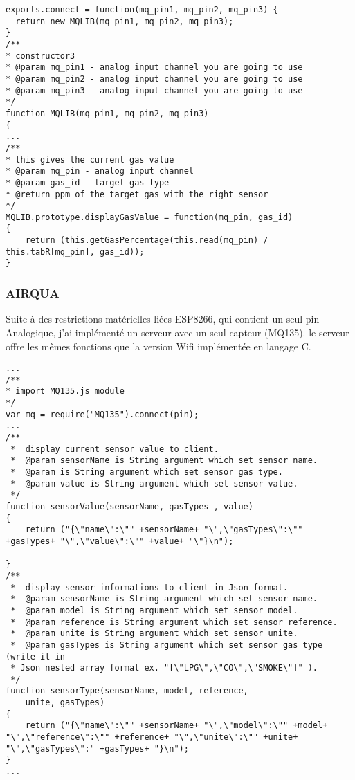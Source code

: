\begin{lstlisting}
exports.connect = function(mq_pin1, mq_pin2, mq_pin3) {
  return new MQLIB(mq_pin1, mq_pin2, mq_pin3);
}
/** 
* constructor3
* @param mq_pin1 - analog input channel you are going to use
* @param mq_pin2 - analog input channel you are going to use
* @param mq_pin3 - analog input channel you are going to use
*/
function MQLIB(mq_pin1, mq_pin2, mq_pin3)
{        
...
/**
* this gives the current gas value
* @param mq_pin - analog input channel
* @param gas_id - target gas type
* @return ppm of the target gas with the right sensor
*/
MQLIB.prototype.displayGasValue = function(mq_pin, gas_id)
{
    return (this.getGasPercentage(this.read(mq_pin) / this.tabR[mq_pin], gas_id));
}
\end{lstlisting}


\subsubsection{AIRQUA}
Suite à des restrictions matérielles liées ESP8266, qui contient un seul pin Analogique, j'ai implémenté un serveur avec un seul capteur (MQ135).
le serveur offre les mêmes fonctions que la version Wifi implémentée en langage C.

\begin{lstlisting}
...
/**
* import MQ135.js module
*/
var mq = require("MQ135").connect(pin);
...
/**
 *  display current sensor value to client.
 *  @param sensorName is String argument which set sensor name.
 *  @param is String argument which set sensor gas type.
 *  @param value is String argument which set sensor value.
 */
function sensorValue(sensorName, gasTypes , value)
{
    return ("{\"name\":\"" +sensorName+ "\",\"gasTypes\":\"" +gasTypes+ "\",\"value\":\"" +value+ "\"}\n");
 
}
/**
 *  display sensor informations to client in Json format.
 *  @param sensorName is String argument which set sensor name.
 *  @param model is String argument which set sensor model.
 *  @param reference is String argument which set sensor reference.
 *  @param unite is String argument which set sensor unite.
 *  @param gasTypes is String argument which set sensor gas type (write it in
 * Json nested array format ex. "[\"LPG\",\"CO\",\"SMOKE\"]" ).
 */
function sensorType(sensorName, model, reference,
    unite, gasTypes)
{
    return ("{\"name\":\"" +sensorName+ "\",\"model\":\"" +model+ "\",\"reference\":\"" +reference+ "\",\"unite\":\"" +unite+ "\",\"gasTypes\":" +gasTypes+ "}\n");
}
...
\end{lstlisting}

